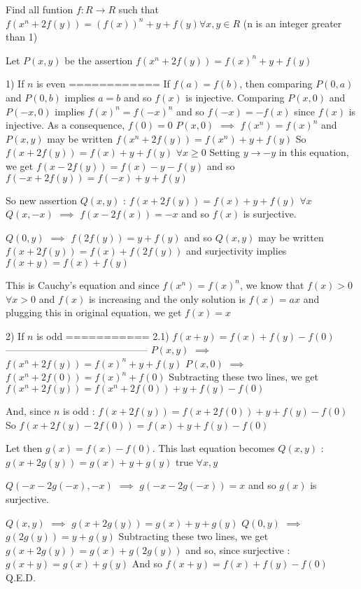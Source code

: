 \begin{solution}
	\begin{tcolorbox}Find all funtion $f: R\to R$ such that
$f(x^n+2f(y))=(f(x))^n +y+f(y) \forall x, y \in R$
(n is an integer greater than 1)\end{tcolorbox}
Let $P(x,y)$ be the assertion $f(x^n+2f(y))=f(x)^n+y+f(y)$

1) If $n$ is even
============
If $f(a)=f(b)$, then comparing $P(0,a)$ and $P(0,b)$ implies $a=b$ and so $f(x)$ is injective.
Comparing $P(x,0)$ and $P(-x,0)$ implies $f(x)^n=f(-x)^n$ and so $f(-x)=-f(x)$ since $f(x)$ is injective.
As a consequence, $f(0)=0$
$P(x,0)$ $\implies$ $f(x^n)=f(x)^n$ and $P(x,y)$ may be written $f(x^n+2f(y))=f(x^n)+y+f(y)$
So $f(x+2f(y))=f(x)+y+f(y)$ $\forall x\ge 0$
Setting $y\to -y$ in this equation, we get $f(x-2f(y))=f(x)-y-f(y)$ and so $f(-x+2f(y))=f(-x)+y+f(y)$

So new assertion $Q(x,y)$ : $f(x+2f(y))=f(x)+y+f(y)$ $\forall x$
$Q(x,-x)$ $\implies$ $f(x-2f(x))=-x$ and so $f(x)$ is surjective.

$Q(0,y)$ $\implies$ $f(2f(y))=y+f(y)$ and so $Q(x,y)$ may be written $f(x+2f(y))=f(x)+f(2f(y))$ and surjectivity implies $f(x+y)=f(x)+f(y)$

This is Cauchy's equation and since $f(x^n)=f(x)^n$, we know that $f(x)>0$ $\forall x>0$ and $f(x)$ is increasing and the only solution is $f(x)=ax$ and plugging this in original equation, we get $\boxed{f(x)=x}$

2) If $n$ is odd
===========
2.1) $f(x+y)=f(x)+f(y)-f(0)$
--------------------------------------------
$P(x,y)$ $\implies$ $f(x^n+2f(y))=f(x)^n+y+f(y)$
$P(x,0)$ $\implies$ $f(x^n+2f(0))=f(x)^n+f(0)$
Subtracting these two lines, we get $f(x^n+2f(y))=f(x^n+2f(0))+y+f(y)-f(0)$

And, since $n$ is odd : $f(x+2f(y))=f(x+2f(0))+y+f(y)-f(0)$
So $f(x+2f(y)-2f(0))=f(x)+y+f(y)-f(0)$

Let then $g(x)=f(x)-f(0)$. This last equation becomes $Q(x,y)$ : $g(x+2g(y))=g(x)+y+g(y)$ true $\forall x,y$

$Q(-x-2g(-x),-x)$ $\implies$ $g(-x-2g(-x))=x$ and so $g(x)$ is surjective.

$Q(x,y)$ $\implies$ $g(x+2g(y))=g(x)+y+g(y)$
$Q(0,y)$ $\implies$ $g(2g(y))=y+g(y)$
Subtracting these two lines, we get $g(x+2g(y))=g(x)+g(2g(y))$ and so, since surjective : $g(x+y)=g(x)+g(y)$
And so $f(x+y)=f(x)+f(y)-f(0)$
Q.E.D.


\end{solution}
